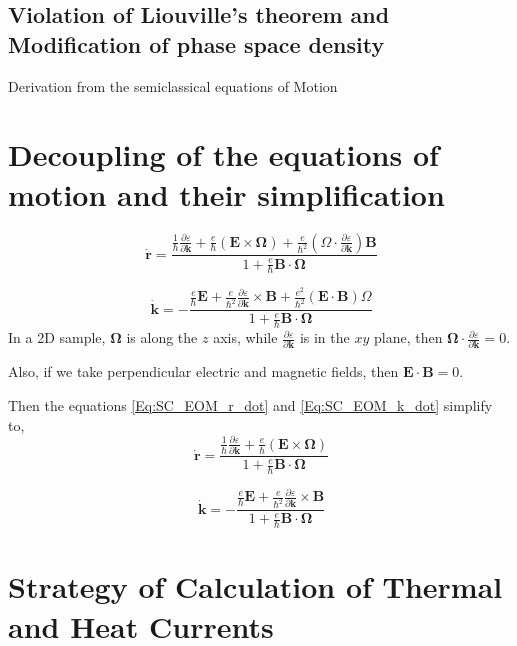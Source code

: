 \documentclass[aps,amsmath,prl]{revtex4-2}
\newcommand{\bvec}[1]{{\mathbf #1}}
\begin{document}
\subsection{Violation of Liouville's theorem and Modification of phase space density}
Derivation from the semiclassical equations of Motion
\section{Decoupling of the equations of motion and their simplification}
\begin{equation}~\label{Eq:SC_EOM_r_dot}
	\dot{\bvec{r}} = \frac{\frac{1}{\hbar} \frac{\partial \varepsilon}{\partial \bvec{k}} + \frac{e}{\hbar} (\bvec{E}\times\bvec{\Omega}) + \frac{e}{\hbar^2} (\Omega \cdot \frac{\partial \varepsilon}{\partial \bvec{k}} )\bvec{B}}{1 + \frac{e}{\hbar} \bvec{B}\cdot\bvec{\Omega}}
\end{equation}

\begin{equation}~\label{Eq:SC_EOM_k_dot}
	\dot{\bvec{k}} = -\frac{\frac{e}{\hbar} \bvec{E} +\frac{e}{\hbar^2} \frac{\partial \varepsilon}{\partial \bvec{k}} \times \bvec{B} + \frac{e^2}{\hbar^2} (\bvec{E}\cdot\bvec{B})\Omega}{1 + \frac{e}{\hbar} \bvec{B}\cdot\bvec{\Omega}}
\end{equation}
In a 2D sample, $\bvec{\Omega}$ is along the $z$ axis, while $\frac{\partial \varepsilon}{\partial \bvec{k}}$ is in the $xy$ plane, then $\bvec{\Omega} \cdot \frac{\partial \varepsilon}{\partial \bvec{k}} = 0$.

Also, if we take perpendicular electric and magnetic fields, then $\bvec{E}\cdot \bvec{B} = 0$.

Then the equations \eqref{Eq:SC_EOM_r_dot} and \eqref{Eq:SC_EOM_k_dot} simplify to,
\begin{equation}~\label{Eq:SC_EOM_r_dot_decoupled}
	\dot{\bvec{r}} = \frac{\frac{1}{\hbar} \frac{\partial \varepsilon}{\partial \bvec{k}} + \frac{e}{\hbar} (\bvec{E}\times\bvec{\Omega})}{1 + \frac{e}{\hbar} \bvec{B}\cdot\bvec{\Omega}}
\end{equation}

\begin{equation}~\label{Eq:SC_EOM_k_dot_decoupled}
	\dot{\bvec{k}} = -\frac{\frac{e}{\hbar} \bvec{E} +\frac{e}{\hbar^2} \frac{\partial \varepsilon}{\partial \bvec{k}} \times \bvec{B}}{1 + \frac{e}{\hbar} \bvec{B}\cdot\bvec{\Omega}}
\end{equation}
\section{Strategy of Calculation of Thermal and Heat Currents}
\end{document}
